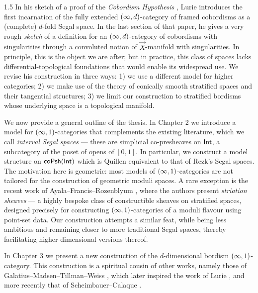 \documentclass{amsbook}
\begin{document}
\begin{spacing}{1.5}
In his sketch of a proof of the \emph{Cobordism Hypothesis} \cite{Lur09}, Lurie introduces the first incarnation of the fully extended $(\operatorname{\infty},d)$-category of framed cobordisms as a (complete) $d$-fold Segal space. In the last section of that paper, he gives a very rough \emph{sketch} of a definition for an $(\operatorname{\infty},d)$-category of cobordisms with singularities through a convoluted notion of $\vec{X}$-manifold with singularities. In principle, this is the object we are after; but in practice, this class of spaces lacks differential-topological foundations that would enable its widespread use. We revise his construction in three ways: 1) we use a different model for higher categories; 2) we make use of the theory of conically smooth stratified spaces and their tangential structures; 3) we limit our construction to stratified bordisms whose underlying space is a topological manifold.

We now provide a general outline of the thesis. In Chapter 2 we introduce a model for $(\operatorname{\infty},1)$-categories that complements the existing literature, which we call \emph{interval Segal spaces} — these are simplicial co-presheaves on $\operatorname{\mathsf{Int}}$, a subcategory of the poset of opens of $[0,1]$. In particular, we construct a model structure on $\mathsf{coPsh}(\operatorname{\mathsf{Int}})$ which is Quillen equivalent to that of Rezk’s Segal spaces. The motivation here is geometric: most models of $(\operatorname{\infty},1)$-categories are not tailored for the construction of geometric moduli spaces. A rare exception is the recent work of Ayala--Francis--Rozenblyum \cite{AFR1}, where the authors present \emph{striation sheaves} — a highly bespoke class of constructible sheaves on stratified spaces, designed precisely for constructing $(\operatorname{\infty},1)$-categories of a moduli flavour using point-set data. Our construction attempts a similar feat, while being less ambitious and remaining closer to more traditional Segal spaces, thereby facilitating higher-dimensional versions thereof.

In Chapter 3 we present a new construction of the $d$-dimensional bordism $(\operatorname{\infty},1)$-category. This construction is a spiritual cousin of other works, namely those of Galatius--Madsen--Tillman--Weiss \cite{GMTW09}, which later inspired the work of Lurie \cite{Lur09}, and more recently that of Scheimbauer--Calaque \cite{CS19}.


\end{spacing}
\end{document}
